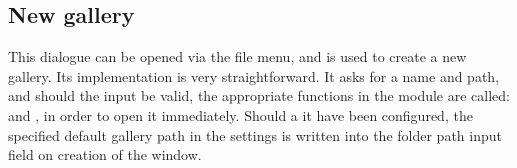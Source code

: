 \subsection{New gallery}

This dialogue can be opened via the file menu, and is used to create a new gallery. Its implementation is very straightforward. It asks for a name and path, and should the input be valid, the appropriate functions in the  module are called:  and , in order to open it immediately. Should a it have been configured, the specified default gallery path in the settings is written into the folder path input field on creation of the window.